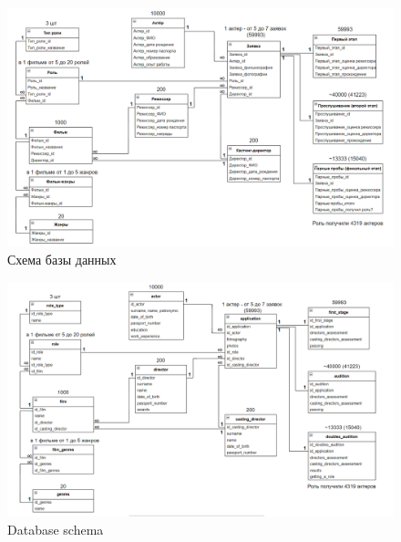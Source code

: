 \documentclass[a3paper]{article}
\begin{document}
	\begin{landscape}
		\setcounter{figure}{2}
		\begin{figure}[h]
		\centering
		\includegraphics[width=1.0\linewidth]{dataBase.png}
		\caption{Схема базы данных}
		\label{fig:dataBase}
	\end{figure}
	
	\newpage
	
	\begin{figure}[h]
		\centering
		\includegraphics[width=1.0\linewidth]{ENG_database.png}
		\caption{Database schema}
		\label{fig:dataBase}
	\end{figure}
    
	\end{landscape}    
\end{document}
